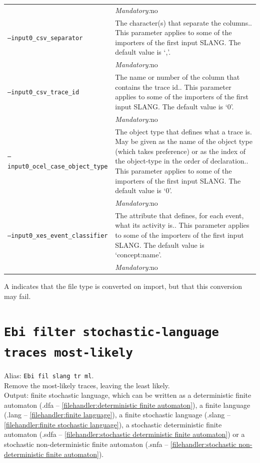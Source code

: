 {\begin{tabularx}{\linewidth}{lX}
&\textit{Mandatory:}\quad no\\
\texttt{--input0\_csv\_separator} & The character(s) that separate the columns.. This parameter applies to some of the importers of the first input SLANG. The default value is `,'.\\
&\textit{Mandatory:}\quad no\\
\texttt{--input0\_csv\_trace\_id} & The name or number of the column that contains the trace id.. This parameter applies to some of the importers of the first input SLANG. The default value is `0'.\\
&\textit{Mandatory:}\quad no\\
\texttt{--input0\_ocel\_case\_object\_type} & The object type that defines what a trace is. May be given as the name of the object type (which takes preference) or as the index of the object-type in the order of declaration.. This parameter applies to some of the importers of the first input SLANG. The default value is `0'.\\
&\textit{Mandatory:}\quad no\\
\texttt{--input0\_xes\_event\_classifier} & The attribute that defines, for each event, what its activity is.. This parameter applies to some of the importers of the first input SLANG. The default value is `concept:name'.\\
&\textit{Mandatory:}\quad no\\
\bottomrule
\end{tabularx}
A \textdagger{} indicates that the file type is converted on import, but that this conversion may fail.
\clearpage\section{\texttt{Ebi filter stochastic-language traces most-likely}}
\label{command:Ebi filter stochastic-language traces most-likely}
Alias: \texttt{Ebi fil slang tr ml}.\\
Remove the most-likely traces, leaving the least likely.\\
\noindent Output: finite stochastic language, which can be written as a deterministic finite automaton (.dfa -- \cref{filehandler:deterministic finite automaton}), a finite language (.lang -- \cref{filehandler:finite language}), a finite stochastic language (.slang -- \cref{filehandler:finite stochastic language}), a stochastic deterministic finite automaton (.sdfa -- \cref{filehandler:stochastic deterministic finite automaton}) or a stochastic non-deterministic finite automaton (.snfa -- \cref{filehandler:stochastic non-deterministic finite automaton}).\\
}
